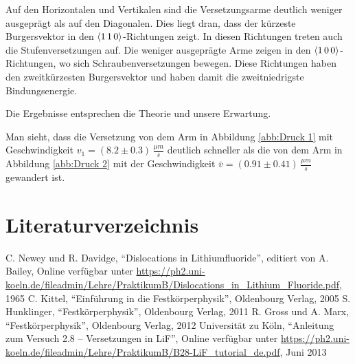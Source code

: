 \documentclass[12pt,a4paper]{scrartcl}
\numberwithin{equation}{section} %
\begin{document}
Auf den Horizontalen und Vertikalen sind die Versetzungsarme deutlich
weniger ausgeprägt als auf den Diagonalen. Dies liegt dran, dass der
kürzeste Burgersvektor in den $\expval{1\,1\,0}$-Richtungen zeigt. In
diesen Richtungen treten auch die Stufenversetzungen auf. Die weniger
ausgeprägte Arme zeigen in den $\expval{1\,0\,0}$-Richtungen, wo sich
Schraubenversetzungen bewegen. Diese Richtungen haben den zweitkürzesten
Burgersvektor und haben damit die zweitniedrigste Bindungsenergie.

Die Ergebnisse entsprechen die Theorie und unsere Erwartung.

Man sieht, dass die Versetzung von dem Arm in Abbildung \ref{abb:Druck 1} mit
Geschwindigkeit $v_1=(8.2 \pm 0.3) \,\frac{\mu m}{s}$ deutlich
schneller als die von dem Arm in Abbildung \ref{abb:Druck 2} mit der
Geschwindigkeit $\bar{v}=(0.91 \pm 0.41) \,\frac{\mu m}{s}$ gewandert
ist.

\clearpage
\hypertarget{literaturverzeichnis}{%
	\section{Literaturverzeichnis}\label{literaturverzeichnis}}
\renewcommand{\section}[2]{} %
\begin{thebibliography}{9}
	 C. Newey und R. Davidge, ``Dislocations in Lithiumfluoride'', editiert von
	A. Bailey, Online verfügbar unter
	\url{https://ph2.uni-koeln.de/fileadmin/Lehre/PraktikumB/Dislocations_in_Lithium_Fluoride.pdf}, 1965
	C. Kittel, ``Einführung in die Festkörperphysik'', Oldenbourg Verlag, 2005
	S. Hunklinger, ``Festkörperphysik'', Oldenbourg Verlag, 2011
	R. Gross und A. Marx, ``Festkörperphysik'', Oldenbourg Verlag, 2012
	Universität zu Köln, ``Anleitung zum Versuch 2.8 -- Versetzungen in
	LiF'', Online verfügbar unter
	\url{https://ph2.uni-koeln.de/fileadmin/Lehre/PraktikumB/B28-LiF_tutorial_de.pdf}, Juni 2013
\end{thebibliography}
\end{document}
